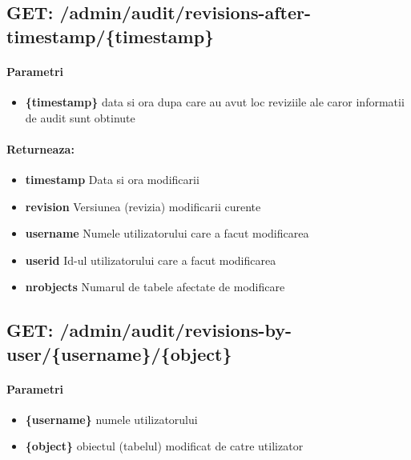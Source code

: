  \subsection*{GET: /admin/audit/revisions-after-timestamp/\{timestamp\}}

\paragraph{Parametri}
\begin{itemize}
\item \textbf{\{timestamp\}}
 data si ora dupa care au avut loc reviziile ale caror informatii de audit sunt obtinute
 \end{itemize}
\paragraph{Returneaza:}
\begin{itemize}
\item \textbf{timestamp}
 Data si ora modificarii
\item \textbf{revision}
 Versiunea (revizia) modificarii curente
\item \textbf{username}
 Numele utilizatorului care a facut modificarea
\item \textbf{userid}
 Id-ul utilizatorului care a facut modificarea
\item \textbf{nrobjects}
 Numarul de tabele afectate de modificare
 \end{itemize}
 \subsection*{GET: /admin/audit/revisions-by-user/\{username\}/\{object\}}

\paragraph{Parametri}
\begin{itemize}
\item \textbf{\{username\}}
 numele utilizatorului
\item \textbf{\{object\}}
 obiectul (tabelul) modificat de catre utilizator
 \end{itemize}
